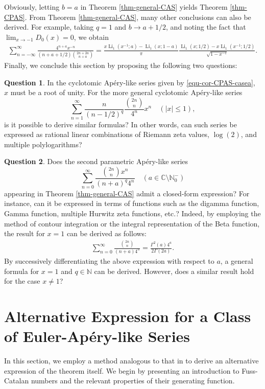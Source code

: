 \documentclass[11pt]{article}
\let\oldsection\section
\renewcommand\section{\setcounter{equation}{0}\oldsection}
\DeclareMathOperator{\Li}{Li}
\def\N{\mathbb{N}}
\theoremstyle{plain}
\theoremstyle{definition}
\newtheorem{qu}{Question}[section]
\begin{document}
Obviously, letting $b=a$ in Theorem \ref{thm-general-CAS} yields Theorem \ref{thm-CPAS}. From Theorem \ref{thm-general-CAS}, many other conclusions can also be derived. For example, taking $q=1$ and $b\rightarrow a+1/2$, and noting the fact that $\lim_{x\rightarrow -1}D_0(x)=0$, we obtain
\begin{align}
\sum_{n=-\infty}^\infty \frac{4^{n+a}x^{-n}}{(n+a+1/2)\binom{2n+2a}{n+a}}=\frac{x \Li_1(x^{-1};a)-\Li_1(x;1-a)}{\pi} \frac{\Li_1(x;1/2)-x\Li_1(x^{-1};1/2)}{\sqrt{1-x^{-1}}}.
\end{align}
Finally, we conclude this section by proposing the following two questions:
\begin{qu}
In the cyclotomic Ap\'ery-like series given by \eqref{equ-cor-CPAS-casea}, $x$ must be a root of unity. For the more general cyclotomic Ap\'ery-like series
\[\sum_{n=1}^\infty \frac{n}{(n-1/2)^q}\frac{\binom{2n}{n}}{4^n}x^n\quad (|x|\leq 1),\]
is it possible to derive similar formulas? In other words, can such series be expressed as rational linear combinations of Riemann zeta values, $\log(2)$, and multiple polylogarithms?
\end{qu}

\begin{qu} Does the second parametric Ap\'ery-like series
\[\sum_{n=0}^\infty \frac{\binom{2n}{n}x^n}{(n+a)^q 4^n}\quad (a\in \mathbb{C}\setminus \N_0^-)\]
appearing in Theorem \ref{thm-general-CAS} admit a closed-form expression? For instance, can it be expressed in terms of functions such as the digamma function, Gamma function, multiple Hurwitz zeta functions, etc.? Indeed, by employing the method of contour integration or the integral representation of the Beta function, the result for $x=1$ can be derived as follows:
\begin{align}
\sum_{n=0}^\infty \frac{\binom{2n}{n}}{(n+a) 4^n}=\frac{\Gamma^2(a)4^a}{2\Gamma(2a)}.
\end{align}
By successively differentiating the above expression with respect to $a$, a general formula for $x=1$ and $q\in \N$ can be derived. However, does a similar result hold for the case $x\neq 1$?
\end{qu}

\section{Alternative Expression for a Class of Euler-Ap\'ery-like Series}\label{secfour}

In this section, we employ a method analogous to that in \cite[Theorem 3.8]{WLX2022} to derive an alternative expression of the theorem itself. We begin by presenting an introduction to Fuss-Catalan numbers and the relevant properties of their generating function.
\end{document}
